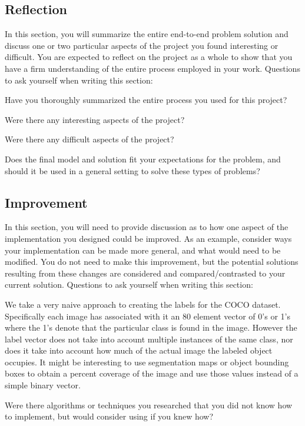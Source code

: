 \documentclass[12pt,journal,compsoc]{IEEEtran}
\begin{document}
\subsection{Reflection}
In this section, you will summarize the entire end-to-end problem solution and discuss one or two particular aspects of the project you found interesting or difficult. You are expected to reflect on the project as a whole to show that you have a firm understanding of the entire process employed in your work. Questions to ask yourself when writing this section:

Have you thoroughly summarized the entire process you used for this project?

Were there any interesting aspects of the project?

Were there any difficult aspects of the project?

Does the final model and solution fit your expectations for the problem, and should it be used in a general setting to solve these types of problems?


\subsection{Improvement}
In this section, you will need to provide discussion as to how one aspect of the implementation you designed could be improved. As an example, consider ways your implementation can be made more general, and what would need to be modified. You do not need to make this improvement, but the potential solutions resulting from these changes are considered and compared/contrasted to your current solution. Questions to ask yourself when writing this section:


We take a very naive approach to creating the labels for the COCO dataset.  Specifically each image has associated with it an 80 element vector of 0's or 1's where the 1's denote that the particular class is found in the image.  However the label vector does not take into account multiple instances of the same class, nor does it take into account how much of the actual image the labeled object occupies.  It might be interesting to use segmentation maps or object bounding boxes to obtain a percent coverage of the image and use those values instead of a simple binary vector.

Were there algorithms or techniques you researched that you did not know how to implement, but would consider using if you knew how?
\end{document}
